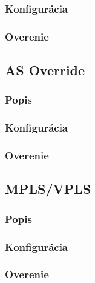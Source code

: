 \documentclass[12pt,twoside,a4paper]{report}
\begin{document}
\subsubsection{Konfigurácia}
\paragraph{}

\subsubsection{Overenie}
\paragraph{}






\subsection{AS Override}
\subsubsection{Popis}
\paragraph{}

\subsubsection{Konfigurácia}
\paragraph{}

\subsubsection{Overenie}
\paragraph{}






\subsection{MPLS/VPLS}
\subsubsection{Popis}
\paragraph{}

\subsubsection{Konfigurácia}
\paragraph{}

\subsubsection{Overenie}
\paragraph{}
\end{document}
